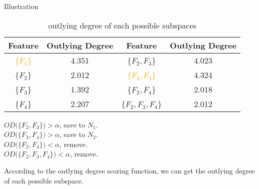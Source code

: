 \documentclass[
 size=14pt,
 paper=smartboard,  %
 mode=present, 		%
 display=slides, 	%
 style=tuliplab,  	%
 pauseslide,
 fleqn,leqno]{powerdot}
\begin{document}
\begin{slide}[toc=,bm=]{Illustration}

\setlength{\abovecaptionskip}{0pt}
\setlength{\belowcaptionskip}{10pt}
\centering
\begin{table}
\caption{outlying degree of each possible subspaces}

\begin{tabular}{c|c|c|c}
  \toprule
  Feature & Outlying Degree & Feature & Outlying Degree \\
  \midrule
  \textcolor{orange}{\{$F_1$\}}  & 4.351  & \{$F_2, F_3$\}  & 4.023 \\
  \{$F_2$\}  & 2.012                      & \textcolor{orange}{\{$F_3, F_4$\}} & 4.324 \\
  \{$F_3$\}  & 1.392                      & \{$F_2, F_4$\} & 2.018 \\
  \{$F_4$\}  & 2.207                      & \{$F_2, F_3, F_4$\} & 2.012 \\
  \bottomrule
\end{tabular}
\end{table}

\bigskip

{
\vspace{.75cm}
$OD(\{$$F_2, F_3$$\}) > \alpha$, save to $N_1$. \\
$OD(\{$$F_3, F_4$$\}) > \alpha$, save to $N_2$. \\
$OD(\{$$F_2, F_4$$\}) < \alpha$, remove. \\
$OD(\{$$F_2, F_3, F_4$$\}) < \alpha$, remove. \\
}

\begin{note}
According to the outlying degree scoring function,
we can get the outlying degree of each possible subspace.


\end{note}
\end{slide}
\end{document}

